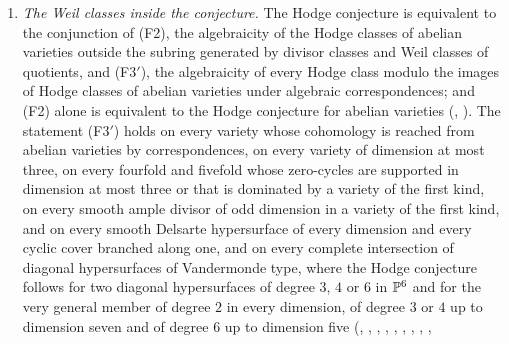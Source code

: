 \begin{theorem}[Closure]
\begin{enumerate}[label=\textup{(\roman*)},leftmargin=2.8em,itemsep=4pt]
\begin{enumerate}[label=\textup{(\alph*)},nosep,leftmargin=2.2em]
    sheaf on a smooth germ of codimension at least two of its support, or
    whose support has codimension at least $n$ (,
    );
  \item at a quartic CM field, a complex with secant character that is
    locally free on a smooth curve at some point, in particular the explicit
    pair of \cite[Example~11.2.7]{Mar25c} (,
    );
  \item a convolution of fewer than $2n$ line bundles with nondegenerate
    differences (); on $E_{0}^{6}$, every convolution
    of the Weil pieces with three multiples of the polarisation, and on
    $E_{0}^{8}$ every one whose pieces have their shifts within six
    consecutive values (, ).
  \end{enumerate}
\item \emph{The Weil classes inside the conjecture.} The Hodge conjecture is
  equivalent to the conjunction of \textup{(F2)}, the algebraicity of the
  Hodge classes of abelian varieties outside the subring generated by divisor
  classes and Weil classes of quotients, and \textup{(F3$'$)}, the
  algebraicity of every Hodge class modulo the images of Hodge classes of
  abelian varieties under algebraic correspondences; and \textup{(F2)} alone
  is equivalent to the Hodge conjecture for abelian varieties
  (, ). The statement \textup{(F3$'$)}
  holds on every variety whose cohomology is reached from abelian varieties by
  correspondences, on every variety of dimension at most three, on every
  fourfold and fivefold whose zero-cycles are supported in dimension at most
  three or that is dominated by a variety of the first kind, on every smooth
  ample divisor of odd dimension in a variety of the first kind, and on every
  smooth Delsarte hypersurface of every dimension and every cyclic cover
  branched along one, and on every complete intersection of diagonal
  hypersurfaces of Vandermonde type, where the Hodge conjecture follows for
  two diagonal hypersurfaces of degree $3$, $4$ or $6$ in $\mathbb{P}^{6}$ and for
  the very general member of degree $2$ in every dimension, of degree $3$ or
  $4$ up to dimension seven and of degree $6$ up to dimension five
  (, ,
  , ,
  , , ,
  , ,

\end{enumerate}
\end{theorem}
